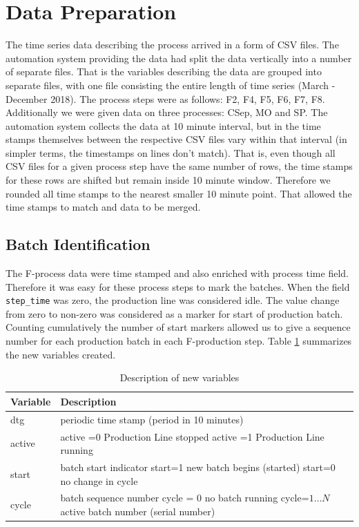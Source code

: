 \documentclass{article}
\begin{document}
\section{Data Preparation}
The time series data describing the process arrived in a form of CSV files. The automation system providing the data had split the data vertically into a number of separate files. That is the variables describing the data are grouped into separate files, with one file consisting the entire length of time series (March - December 2018). The process steps were as follows: F2, F4, F5, F6, F7, F8. Additionally we were given data on three processes: CSep, MO and SP. The automation system collects the data at 10 minute interval, but in the time stamps themselves between the respective CSV files vary within that interval (in simpler terms, the timestamps on lines don't match). That is, even though all CSV files for a given process step have the same number of rows, the time stamps for these rows are shifted but remain inside 10 minute window. Therefore we rounded all time stamps to the nearest smaller 10 minute point. That allowed the time stamps to match and data to be merged.

\subsection{Batch Identification}
The F-process data were time stamped and also enriched with process time field. Therefore it was easy for these process steps to mark the batches. When the field \texttt{step\_time} was zero, the production line was considered idle. The value change from zero to non-zero was considered as a marker for start of production batch. Counting cumulatively the number of start markers allowed us to give a sequence number for each production batch in each F-production step. Table \ref{tab:new_attributes} summarizes the new variables created.

\begin{table}[ht]
    \centering
    \begin{tabular}{l p{9.5cm}}
        Variable &  Description \\
        \hline
        dtg & periodic time stamp (period in 10 minutes) \\
        active &   	    active =0   Production Line stopped \newline
                        active =1   Production Line running
        \\
        start&	        batch start indicator \newline
                        start=1 new batch begins (started) \newline
                        start=0 no change in cycle
        \\
        cycle&	batch sequence number \newline
                cycle = 0 no batch running \newline
                cycle=$1\ldots N$  active batch number (serial number)
        \\
        \hline
    \end{tabular}
    \caption{Description of new variables}
    \label{tab:new_attributes}
\end{table}
\end{document}
